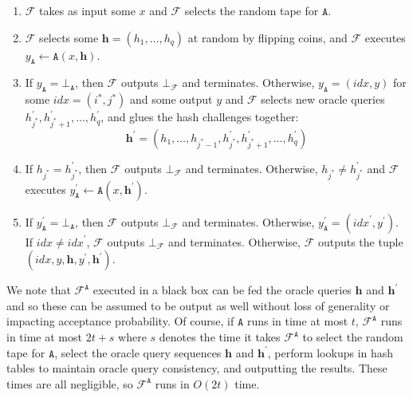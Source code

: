 \documentclass[draft]{llncs} %
\begin{document}
\begin{enumerate}
\item $\mathcal{F}$ takes as input some $x$ and $\mathcal{F}$ selects the random tape for $\texttt{A}$.

\item $\mathcal{F}$ selects some $\textbf{h} = (h_1, \ldots, h_q)$ at random by flipping coins, and $\mathcal{F}$ executes $y_\texttt{A} \leftarrow \texttt{A}(x,\textbf{h})$.

\item If $y_{\texttt{A}} = \bot_{\texttt{A}}$, then $\mathcal{F}$ outputs $\bot_{\mathcal{F}}$ and terminates. Otherwise, $y_{\texttt{A}} = (\textit{idx}, y)$ for some $\textit{idx}=(i^*,j^*)$ and some output $y$ and $\mathcal{F}$ selects new oracle queries $h_{j^*}^\prime, h_{j^*+1}^\prime, \ldots, h_q^\prime$, and glues the hash challenges together: $$\textbf{h}^\prime = (h_1, \ldots, h_{j^*-1}, h_{j^*}^\prime, h_{j^*+1}^\prime, \ldots, h_q^\prime)$$

\item If $h_{j^*} = h_{j^{*}}^\prime$, then $\mathcal{F}$ outputs $\bot_{\mathcal{F}}$ and terminates. Otherwise, $h_{j^*} \neq h_{j^{*}}^\prime$ and $\mathcal{F}$ executes $y_\texttt{A}^\prime \leftarrow \texttt{A}(x,\textbf{h}^\prime)$.

\item If $y_{\texttt{A}}^\prime = \bot_{\texttt{A}}$, then $\mathcal{F}$ outputs $\bot_{\mathcal{F}}$ and terminates. Otherwise, $y_{\texttt{A}}^\prime = (\textit{idx}^{\prime}, y^\prime)$. If $\textit{idx} \neq \textit{idx}^\prime$, $\mathcal{F}$ outputs $\bot_{\mathcal{F}}$ and terminates. Otherwise, $\mathcal{F}$ outputs the tuple $(\textit{idx}, y, \textbf{h}, y^\prime, \textbf{h}^\prime)$.
\end{enumerate}

We note that $\mathcal{F}^{\texttt{A}}$ executed in a black box can be fed the oracle queries $\textbf{h}$ and $\textbf{h}^\prime$ and so these can be assumed to be output as well without loss of generality or impacting acceptance probability. Of course, if $\texttt{A}$ runs in time at most $t$, $\mathcal{F}^{\texttt{A}}$ runs in time at most $2t+s$ where $s$ denotes the time it takes $\mathcal{F}^{\texttt{A}}$ to select the random tape for $\texttt{A}$, select the oracle query sequences $\textbf{h}$ and $\textbf{h}^\prime$, perform lookups in hash tables to maintain oracle query consistency, and outputting the results. These times are all negligible, so $\mathcal{F}^{\texttt{A}}$ runs in $O(2t)$ time.
\end{document}
